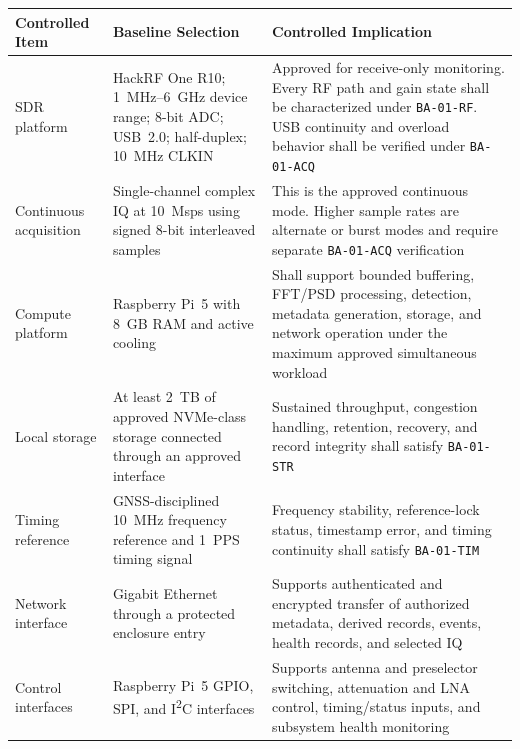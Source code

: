 \documentclass[11pt,a4paper]{article}
\begin{document}
	\begin{table}[htbp]
		\centering
		\small
		\renewcommand{\arraystretch}{1.2}
		\begin{tabularx}{\columnwidth}{
				>{\raggedright\arraybackslash}p{2.8cm}
				>{\raggedright\arraybackslash}p{4.1cm}
				>{\raggedright\arraybackslash}X}
			\toprule
			\textbf{Controlled Item} &
			\textbf{Baseline Selection} &
			\textbf{Controlled Implication} \\
			\midrule
			
			SDR platform &
			HackRF One R10; 1~MHz--6~GHz device range; 8-bit ADC;
			USB~2.0; half-duplex; 10~MHz CLKIN &
			Approved for receive-only monitoring. Every RF path and gain state
			shall be characterized under \texttt{BA-01-RF}. USB continuity and
			overload behavior shall be verified under \texttt{BA-01-ACQ} \\
			
			Continuous acquisition &
			Single-channel complex IQ at 10~Msps using signed 8-bit interleaved
			samples &
			This is the approved continuous mode. Higher sample rates are
			alternate or burst modes and require separate
			\texttt{BA-01-ACQ} verification \\
			
			Compute platform &
			Raspberry Pi~5 with 8~GB RAM and active cooling &
			Shall support bounded buffering, FFT/PSD processing, detection,
			metadata generation, storage, and network operation under the
			maximum approved simultaneous workload \\
			
			Local storage &
			At least 2~TB of approved NVMe-class storage connected through an
			approved interface &
			Sustained throughput, congestion handling, retention, recovery, and
			record integrity shall satisfy \texttt{BA-01-STR} \\
			
			Timing reference &
			GNSS-disciplined 10~MHz frequency reference and 1~PPS timing signal &
			Frequency stability, reference-lock status, timestamp error, and
			timing continuity shall satisfy \texttt{BA-01-TIM} \\
			
			Network interface &
			Gigabit Ethernet through a protected enclosure entry &
			Supports authenticated and encrypted transfer of authorized metadata,
			derived records, events, health records, and selected IQ \\
			
			Control interfaces &
			Raspberry Pi~5 GPIO, SPI, and I\textsuperscript{2}C interfaces &
			Supports antenna and preselector switching, attenuation and LNA
			control, timing/status inputs, and subsystem health monitoring \\
			

\end{tabularx}
\end{table}
\end{document}
